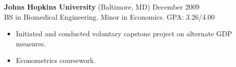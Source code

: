 \documentclass[margin]{res}
\newcommand{\locdatesubsection}[3]{\textbf{#1} (#2) \hfill #3}
\begin{document}
\begin{sloppypar}
\begin{resume}




\locdatesubsection{Johns Hopkins University}{Baltimore, MD}{December 2009}\\
BS in Biomedical Engineering. Minor in Economics. GPA: 3.26/4.00
\begin{itemize}
    \item Initiated and conducted voluntary capstone project on alternate GDP measures. 
    \item Econometrics coursework.
\end{itemize}


\end{resume}
\end{sloppypar}
\end{document}
